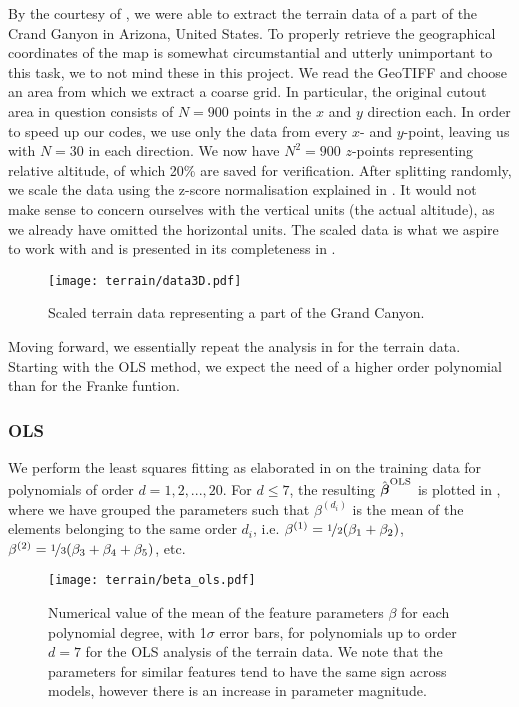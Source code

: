     By the courtesy of \citep{EarthExplorer}, we were able to extract the terrain data of a part of the Crand Ganyon in Arizona, United States. To properly retrieve the geographical coordinates of the map is somewhat circumstantial and utterly unimportant to this task, we to not mind these in this project. We read the GeoTIFF and choose an area from which we extract a coarse grid. In particular, the original cutout area in question consists of $N=900$ points in the $x$ and $y$ direction each. In order to speed up our codes, we use only the data from every  $x$- and $y$-point, leaving us with $N=30$ in each direction. We now have $N^2=900$ $z$-points representing relative altitude, of which 20\% are saved for verification. After splitting randomly, we scale the data using the z-score normalisation explained in . It would not make sense to concern ourselves with the vertical units (the actual altitude), as we already have omitted the horizontal units. The scaled data is what we aspire to work with and is presented in its completeness in .

    \begin{figure}
        \texttt{[image: terrain/data3D.pdf]}
        \caption{Scaled terrain data representing a part of the Grand Canyon.}
        \label{fig:gc_data}
    \end{figure}

    Moving forward, we essentially repeat the analysis in  for the terrain data. Starting with the OLS method, we expect the need of a higher order polynomial than for the Franke funtion.

        \subsubsection{OLS}\label{sec:gc_olsanalysis}

        We perform the least squares fitting as elaborated in  on the training data for polynomials of order $d=1,2,..., 20$. For $d\leq 7$, the resulting $\hat{\boldsymbol{\beta}}^\text{OLS}$ is plotted in , where we have grouped the parameters such that $\beta^{(d_i)}$ is the mean of the elements belonging to the same order $d_i$, i.e. $\beta^{(1)} = \nicefrac{1}{2}(\beta_1 + \beta_2)$, $\beta^{(2)} = \nicefrac{1}{3}(\beta_3 + \beta_4 + \beta_5)$, etc. 

        \begin{figure}
            \texttt{[image: terrain/beta\_ols.pdf]}
            \caption{Numerical value of the mean of the feature parameters $\beta$ for each polynomial degree, with 1$\sigma$ error bars, for polynomials up to order $d=7$ for the OLS analysis of the terrain data. We note that the parameters for similar features tend to have the same sign across models, however there is an increase in parameter magnitude.}
            \label{fig:gc_beta_with_standard_deviation}
        \end{figure}

